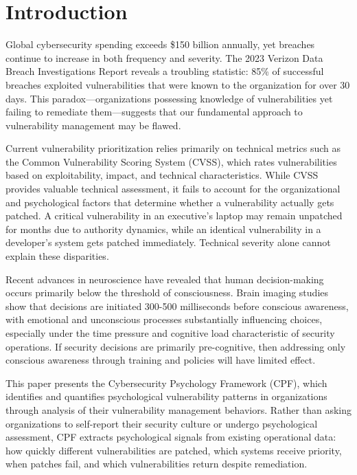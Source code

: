 \documentclass[11pt,a4paper]{article}
\begin{document}
\section{Introduction}

Global cybersecurity spending exceeds \$150 billion annually\cite{gartner2023}, yet breaches continue to increase in both frequency and severity. The 2023 Verizon Data Breach Investigations Report reveals a troubling statistic: 85\% of successful breaches exploited vulnerabilities that were known to the organization for over 30 days\cite{verizon2023}. This paradox—organizations possessing knowledge of vulnerabilities yet failing to remediate them—suggests that our fundamental approach to vulnerability management may be flawed.

Current vulnerability prioritization relies primarily on technical metrics such as the Common Vulnerability Scoring System (CVSS), which rates vulnerabilities based on exploitability, impact, and technical characteristics. While CVSS provides valuable technical assessment, it fails to account for the organizational and psychological factors that determine whether a vulnerability actually gets patched. A critical vulnerability in an executive's laptop may remain unpatched for months due to authority dynamics, while an identical vulnerability in a developer's system gets patched immediately. Technical severity alone cannot explain these disparities.

Recent advances in neuroscience have revealed that human decision-making occurs primarily below the threshold of consciousness\cite{libet1983,soon2008}. Brain imaging studies show that decisions are initiated 300-500 milliseconds before conscious awareness, with emotional and unconscious processes substantially influencing choices, especially under the time pressure and cognitive load characteristic of security operations. If security decisions are primarily pre-cognitive, then addressing only conscious awareness through training and policies will have limited effect.

This paper presents the Cybersecurity Psychology Framework (CPF), which identifies and quantifies psychological vulnerability patterns in organizations through analysis of their vulnerability management behaviors. Rather than asking organizations to self-report their security culture or undergo psychological assessment, CPF extracts psychological signals from existing operational data: how quickly different vulnerabilities are patched, which systems receive priority, when patches fail, and which vulnerabilities return despite remediation.
\end{document}
